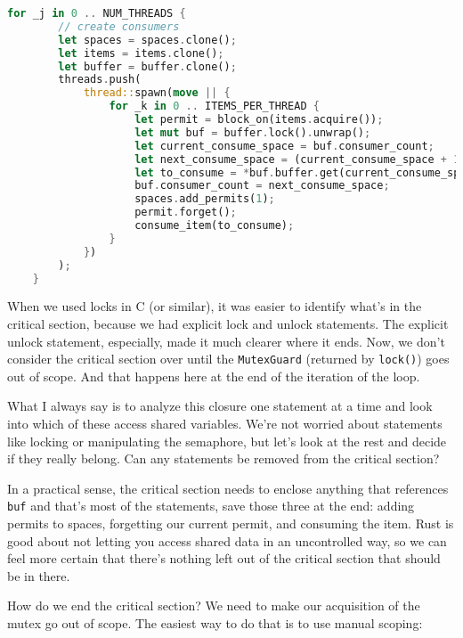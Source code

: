 \begin{lstlisting}[language=Rust]
    for _j in 0 .. NUM_THREADS {
        // create consumers
        let spaces = spaces.clone();
        let items = items.clone();
        let buffer = buffer.clone();
        threads.push(
            thread::spawn(move || {
                for _k in 0 .. ITEMS_PER_THREAD {
                    let permit = block_on(items.acquire());
                    let mut buf = buffer.lock().unwrap();
                    let current_consume_space = buf.consumer_count;
                    let next_consume_space = (current_consume_space + 1) % buf.buffer.len();
                    let to_consume = *buf.buffer.get(current_consume_space).unwrap();
                    buf.consumer_count = next_consume_space;
                    spaces.add_permits(1);
                    permit.forget();
                    consume_item(to_consume);
                }
            })
        );
    }

\end{lstlisting}

When we used locks in C (or similar), it was easier to identify what's in the critical section, because we had explicit lock and unlock statements. The explicit unlock statement, especially, made it much clearer where it ends. Now, we don't consider the critical section over until the \texttt{MutexGuard} (returned by \texttt{lock()}) goes out of scope. And that happens here at the end of the iteration of the loop.

What I always say is to analyze this closure one statement at a time and look into which of these access shared variables. We're not worried about statements like locking or manipulating the semaphore, but let's look at the rest and decide if they really belong. Can any statements be removed from the critical section?

In a practical sense, the critical section needs to enclose anything that references \texttt{buf} and that's most of the statements, save those three at the end: adding permits to spaces, forgetting our current permit, and consuming the item. Rust is good about not letting you access shared data in an uncontrolled way, so we can feel more certain that there's nothing left out of the critical section that should be in there.

How do we end the critical section? We need to make our acquisition of the mutex go out of scope. The easiest way to do that is to use manual scoping:

